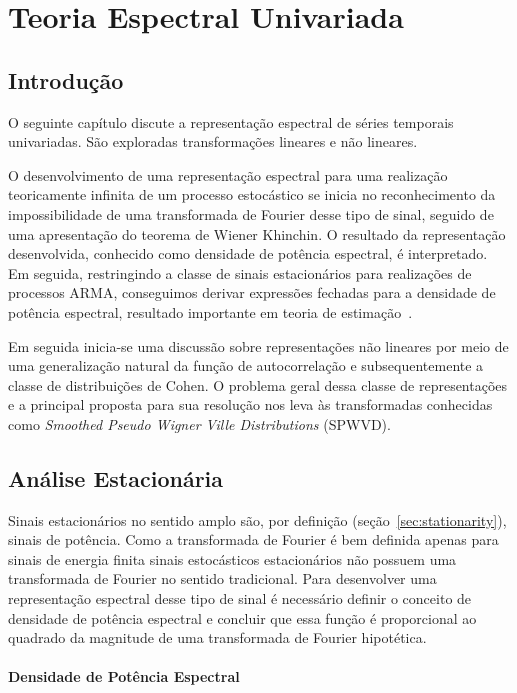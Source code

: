 \chapter{Teoria Espectral Univariada}\label{chap:spectral_analysis}

\section*{Introdução}

O seguinte capítulo discute a representação espectral de séries temporais
univariadas. São exploradas transformações lineares e não lineares.

O desenvolvimento de uma representação espectral para uma realização
teoricamente infinita de um processo estocástico se inicia no reconhecimento da
impossibilidade de uma transformada de Fourier desse tipo de sinal, seguido de
uma apresentação do teorema de Wiener Khinchin. O resultado da representação
desenvolvida, conhecido como densidade de potência espectral, é interpretado.
Em seguida, restringindo a classe de sinais estacionários para realizações de
processos ARMA, conseguimos derivar expressões fechadas para a densidade
de potência espectral, resultado importante em teoria de
estimação~\cite{estimation_theory}.

Em seguida inicia-se uma discussão sobre representações não lineares por meio
de uma generalização natural da função de autocorrelação e subsequentemente a
classe de distribuições de Cohen. O problema geral dessa classe de
representações e a principal proposta para sua resolução nos leva às
transformadas conhecidas como \emph{Smoothed Pseudo Wigner Ville
Distributions} (SPWVD).

\section{Análise Estacionária}

Sinais estacionários no sentido amplo são, por definição
(seção~\ref{sec:stationarity}), sinais de potência. Como a transformada de
Fourier é bem definida apenas para sinais de energia finita sinais estocásticos
estacionários não possuem uma transformada de Fourier no sentido tradicional.
Para desenvolver uma representação espectral desse tipo de sinal é necessário
definir o conceito de densidade de potência espectral e concluir que essa
função é proporcional ao quadrado da magnitude de uma transformada de Fourier
hipotética.

\subsubsection{Densidade de Potência Espectral}

